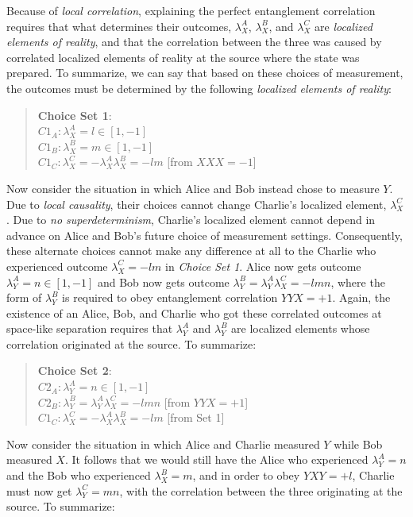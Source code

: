\documentclass[a4paper]{article}
\begin{document}
Because of \textit{local correlation}, explaining the perfect entanglement correlation requires that what determines their outcomes, $\lambda_X^A$, $\lambda_X^B$, and $\lambda_X^C$ are \textit{localized elements of reality}, and that the correlation between the three was caused by correlated localized elements of reality at the source where the state was prepared.  To summarize, we can say that based on these choices of measurement, the outcomes must be determined by the following \textit{localized elements of reality}:

\begin{quote}
\textbf{Choice Set 1}:\\
$C1_A: \lambda_X^A = l \in [1,-1]$\\
$C1_B: \lambda_X^B = m \in [1,-1]$\\ 
$C1_C: \lambda_X^C = -\lambda_X^A \lambda_X^B = -lm$ [from $XXX=-1$]
\end{quote}

Now consider the situation in which Alice and Bob instead chose to measure $Y$. Due to \textit{local causality}, their choices cannot change Charlie's localized element, $\lambda_X^C$. Due to \textit{no superdeterminism}, Charlie's localized element cannot depend in advance on Alice and Bob's future choice of measurement settings. Consequently, these alternate choices cannot make any difference at all to the Charlie who experienced outcome $\lambda_X^C = -lm$ in \textit{Choice Set 1}. Alice now gets outcome $\lambda_Y^A = n \in [1,-1]$ and Bob now gets outcome $\lambda_Y^B = \lambda_Y^A \lambda_X^C = -lmn$, where the form of $\lambda_Y^B$ is required to obey entanglement correlation $YYX = +1$. Again, the existence of an Alice, Bob, and Charlie who got these correlated outcomes at space-like separation requires that $\lambda_Y^A$ and $\lambda_Y^B$ are localized elements whose correlation originated at the source. To summarize:

\begin{quote}
\textbf{Choice Set 2}:\\
$C2_A: \lambda_Y^A = n \in [1,-1]$\\
$C2_B: \lambda_Y^B = \lambda_Y^A \lambda_X^C = -lmn$ [from $YYX = +1$]\\ 
$C1_C: \lambda_X^C = -\lambda_X^A \lambda_X^B = -lm$ [from Set 1]
\end{quote}

Now consider the situation in which Alice and Charlie measured $Y$ while Bob measured $X$. It follows that we would still have the Alice who experienced $\lambda_Y^A = n$ and the Bob who experienced $\lambda_X^B = m$, and in order to obey $YXY = +l$, Charlie must now get $\lambda_Y^C = mn$, with the correlation between the three originating at the source.  To summarize:
\end{document}

